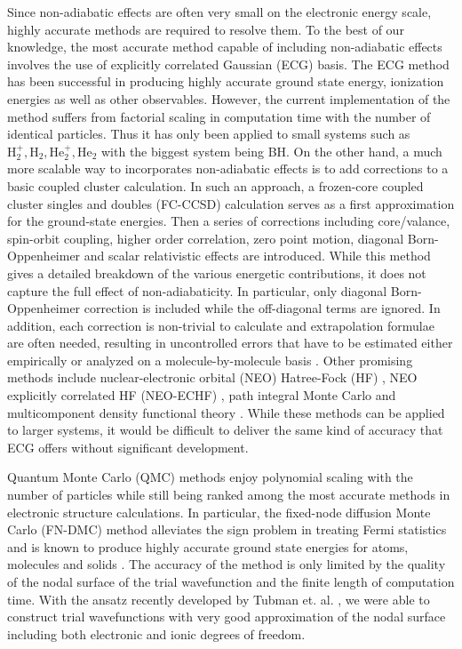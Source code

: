 Since non-adiabatic effects are often very small on the electronic energy scale, highly accurate methods are required to resolve them. To the best of our knowledge, the most accurate method capable of including non-adiabatic effects involves the use of explicitly correlated Gaussian (ECG) basis. The ECG method has been successful in producing highly accurate ground state energy, ionization energies as well as other observables. However, the current implementation of the method suffers from factorial scaling in computation time with the number of identical particles. Thus it has only been applied to small systems such as $\text{H}_2^+,\text{H}_2,\text{He}_2^+,\text{He}_2$ with the biggest system being BH. On the other hand, a much more scalable way to incorporates non-adiabatic effects is to add corrections to a basic coupled cluster calculation\cite{Feller_Corrections}. In such an approach, a frozen-core coupled cluster singles and doubles (FC-CCSD) \cite{Purvis_CCSD} calculation serves as a first approximation for the ground-state energies. Then a series of corrections including core/valance, spin-orbit coupling, higher order correlation, zero point motion, diagonal Born-Oppenheimer and scalar relativistic effects are introduced. While this method gives a detailed breakdown of the various energetic contributions, it does not capture the full effect of non-adiabaticity. In particular, only diagonal Born-Oppenheimer correction is included while the off-diagonal terms are ignored. In addition, each correction is non-trivial to calculate and extrapolation formulae are often needed, resulting in uncontrolled errors that have to be estimated either empirically or analyzed on a molecule-by-molecule basis \cite{Feller_Error}. Other promising methods include nuclear-electronic orbital (NEO) Hatree-Fock (HF) \cite{Sharon_NEO}, NEO explicitly correlated HF (NEO-ECHF) \cite{Sharon_NEOX,Sharon_NEOX1,Sharon_NEOX2}, path integral Monte Carlo \cite{Ilkka_Path,Ilkka_Path1,Ilkka_Path2} and multicomponent density functional theory \cite{Sharon_NEO-DFT,Sharon_NEO-DFT1,Sharon_NEO-DFT2,Sharon_NEO-DFT3,Gross_NEO-DFT,Gross_NEO-DFT1}. While these methods can be applied to larger systems, it would be difficult to deliver the same kind of accuracy that ECG offers without significant development. 

Quantum Monte Carlo (QMC) methods enjoy polynomial scaling with the number of particles while still being ranked among the most accurate methods in electronic structure calculations. In particular, the fixed-node diffusion Monte Carlo (FN-DMC) method alleviates the sign problem in treating Fermi statistics \cite{Ceperley_HEG,Ceperley_QMC} and is known to produce highly accurate ground state energies for atoms, molecules and solids \cite{QMC_Review}. The accuracy of the method is only limited by the quality of the nodal surface of the trial wavefunction and the finite length of computation time. With the ansatz recently developed by Tubman et. al. \cite{Tubman_ECG}, we were able to construct trial wavefunctions with very good approximation of the nodal surface including both electronic and ionic degrees of freedom.